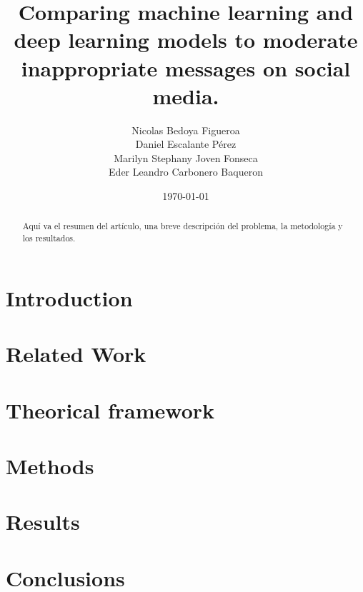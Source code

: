 \documentclass[conference]{IEEEtran}
\title{Comparing machine learning and deep learning models to moderate inappropriate messages on social media.}
\author{Nicolas Bedoya Figueroa \\
Daniel Escalante Pérez \\
Marilyn Stephany Joven Fonseca \\
Eder Leandro Carbonero Baqueron \\}
\date{\today}
\begin{document}
\maketitle
\begin{abstract}
Aquí va el resumen del artículo, una breve descripción del problema, la metodología y los resultados.
\end{abstract}

\section{Introduction}


\section{Related Work}


\section{Theorical framework}


\section{Methods}
\label{sec:methods}


\section{Results}


\section{Conclusions}




\end{document}

